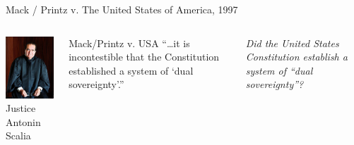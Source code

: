 \begin{frame}{Mack / Printz v. The United States of America, 1997}
    \begin{columns}[onlytextwidth]
            \centering
            \includegraphics[height=0.75\textheight]{img/scalia.jpg} \\
            Justice Antonin Scalia \\

            \begin{block}{Mack/Printz v. USA}
                ``\ldots it is incontestible that the Constitution established a system of `dual sovereignty'.''
            \end{block}
            \pause
            {
                \color{red}
                \emph{Did the United States Constitution establish a system of ``dual sovereignty''?}
            }
    \end{columns}
\end{frame}

